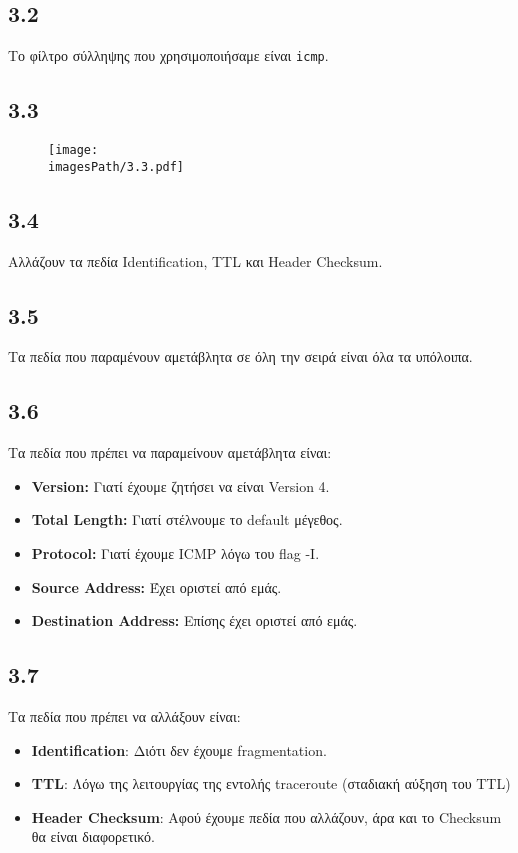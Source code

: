 		\subsection*{3.2}
			Το φίλτρο σύλληψης που χρησιμοποιήσαμε είναι \verb|icmp|.

		\subsection*{3.3}
			\begin{figure}[H]
				\texttt{[image: \\imagesPath/3.3.pdf]}
			\end{figure}

		\subsection*{3.4}
			Αλλάζουν τα πεδία Identification, TTL και Header Checksum.
		
		\subsection*{3.5}
			Τα πεδία που παραμένουν αμετάβλητα σε όλη την σειρά είναι όλα τα υπόλοιπα.

		\subsection*{3.6}
		
			Τα πεδία που πρέπει να παραμείνουν αμετάβλητα είναι:
			\begin{itemize}
				\item \textbf{Version:} Γιατί έχουμε ζητήσει να είναι Version 4.
				\item \textbf{Total Length:} Γιατί στέλνουμε το default μέγεθος.
				\item \textbf{Protocol:} Γιατί έχουμε ICMP λόγω του flag -Ι.
				\item \textbf{Source Address:} Έχει οριστεί από εμάς.
				\item \textbf{Destination Address:} Επίσης έχει οριστεί από εμάς.
			\end{itemize}
		
		\subsection*{3.7}
			Τα πεδία που πρέπει να αλλάξουν είναι:
			\begin{itemize}
				\item \textbf{Identification}: Διότι δεν έχουμε fragmentation.
				\item \textbf{TTL}: Λόγω της λειτουργίας της εντολής traceroute (σταδιακή αύξηση του TTL)
				\item \textbf{Header Checksum}: Αφού έχουμε πεδία που αλλάζουν, άρα και το Checksum θα είναι διαφορετικό.
			\end{itemize}
			
